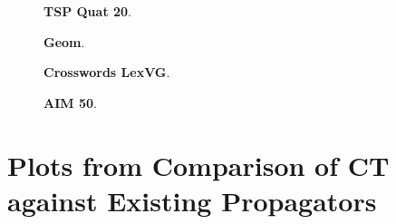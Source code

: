 \documentclass[a4paper,11pt]{article}
\numberwithin{equation}{section}
\begin{document}
\begin{figure}
  \begin{minipage}[b][8cm][s]{0.45\textwidth}
    \centering
    \vfill
    \begin{tikzpicture}[scale=0.9]
      
    \end{tikzpicture}
    \vfill
    \caption{\textbf{TSP Quat 20}.}
    \vspace{\baselineskip}
  \end{minipage}\qquad
  \begin{minipage}[b][8cm][s]{0.45\textwidth}
    \centering
    \vfill
    \begin{tikzpicture}[scale=0.9]
      
    \end{tikzpicture}
    \vfill
    \caption{\textbf{Geom}.}
    \vspace{\baselineskip}
  \end{minipage}\qquad
  \begin{minipage}[b][8cm][s]{0.45\textwidth}
    \centering
    \vfill
    \begin{tikzpicture}[scale=0.9]
      
    \end{tikzpicture}
    \vfill
    \caption{\textbf{Crosswords LexVG}.}
    \vspace{\baselineskip}
  \end{minipage} \qquad
    \begin{minipage}[b][8cm][s]{0.45\textwidth}
    \centering
    \vfill
    \begin{tikzpicture}[scale=0.9]
      
    \end{tikzpicture}
    \vfill
    \caption{\textbf{AIM 50}.}
    \vspace{\baselineskip}
  \end{minipage} \qquad
  
\end{figure}

\clearpage

\section{Plots from Comparison of CT against Existing Propagators}
\label{app:compare-gecode}
\end{document}
